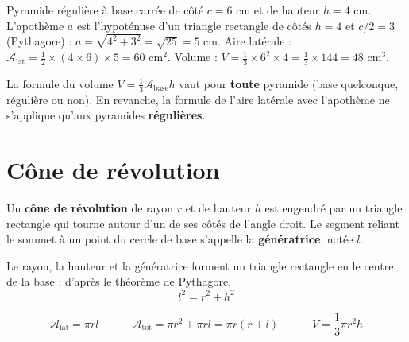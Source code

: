 \begin{exemple}
Pyramide régulière à base carrée de côté $c=6$ cm et de hauteur $h=4$ cm. L'apothème $a$ est
l'hypoténuse d'un triangle rectangle de côtés $h=4$ et $c/2=3$ (Pythagore) :
$a=\sqrt{4^{2}+3^{2}}=\sqrt{25}=5$ cm.
Aire latérale : $\mathcal{A}_{\text{lat}}=\frac{1}{2}\times(4\times6)\times5=60$ cm$^{2}$.
Volume : $V=\frac{1}{3}\times6^{2}\times4=\frac{1}{3}\times144=48$ cm$^{3}$.
\end{exemple}

\begin{remarque}
La formule du volume $V=\frac13\mathcal{A}_{\text{base}}h$ vaut pour \textbf{toute} pyramide
(base quelconque, régulière ou non). En revanche, la formule de l'aire latérale avec
l'apothème ne s'applique qu'aux pyramides \textbf{régulières}.
\end{remarque}

\section{Cône de révolution}

\begin{definition}
Un \textbf{cône de révolution} de rayon $r$ et de hauteur $h$ est engendré par un triangle
rectangle qui tourne autour d'un de ses côtés de l'angle droit. Le segment reliant le sommet
à un point du cercle de base s'appelle la \textbf{génératrice}, notée $l$.
\end{definition}

\begin{propriete}
Le rayon, la hauteur et la génératrice forment un triangle rectangle en le centre de la
base : d'après le théorème de Pythagore,
\[
l^{2}=r^{2}+h^{2}
\]
\end{propriete}

\begin{propriete}
\[
\mathcal{A}_{\text{lat}}=\pi r l \qquad\quad \mathcal{A}_{\text{tot}}=\pi r^{2}+\pi rl=\pi r(r+l) \qquad\quad V=\frac{1}{3}\pi r^{2}h
\]
\end{propriete}

\begin{illus}
\end{illus}

